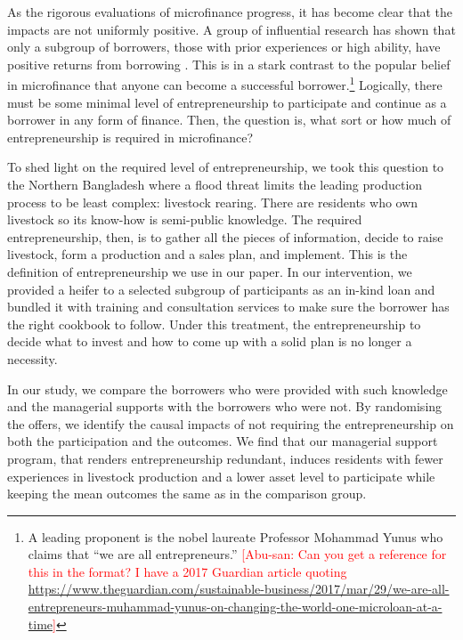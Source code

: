 	As the rigorous evaluations of microfinance progress, it has become clear that the impacts are not uniformly positive. A group of influential research has shown that only a subgroup of borrowers, those with prior experiences or high ability, have positive returns from borrowing \citep{Banerjee2015Miracle, Mckenzie2017Spurring, Buera2017, Banerjee2019MFPovertyTrap}. This is in a stark contrast to the popular belief in microfinance that anyone can become a successful borrower.\footnote{A leading proponent is the nobel laureate Professor Mohammad Yunus who claims that ``we are all entrepreneurs.'' \textcolor{red}{[Abu-san: Can you get a reference for this in the \BibTeX format? I have a 2017 Guardian article quoting \href{we are all entrepreneurs}{https://www.theguardian.com/sustainable-business/2017/mar/29/we-are-all-entrepreneurs-muhammad-yunus-on-changing-the-world-one-microloan-at-a-time}]}} Logically, there must be some minimal level of entrepreneurship to participate and continue as a borrower in any form of finance. Then, the question is, what sort or how much of entrepreneurship is required in microfinance? 
	
	To shed light on the required level of entrepreneurship, we took this question to the Northern Bangladesh where a flood threat limits the leading production process to be least complex: livestock rearing. There are residents who own livestock so its know-how is semi-public knowledge. The required entrepreneurship, then, is to gather all the pieces of information, decide to raise livestock, form a production and a sales plan, and implement. This is the definition of entrepreneurship we use in our paper. In our intervention, we provided a heifer to a selected subgroup of participants as an in-kind loan and bundled it with training and consultation services to make sure the borrower has the right cookbook to follow. Under this treatment, the entrepreneurship to decide what to invest and how to come up with a solid plan is no longer a necessity.

	In our study, we compare the borrowers who were provided with such knowledge and the managerial supports with the borrowers who were not. By randomising the offers, we identify the causal impacts of not requiring the entrepreneurship on both the participation and the outcomes. We find that our managerial support program, that renders entrepreneurship redundant, induces residents with fewer experiences in livestock production and a lower asset level to participate while keeping the mean outcomes the same as in the comparison group.%
	
